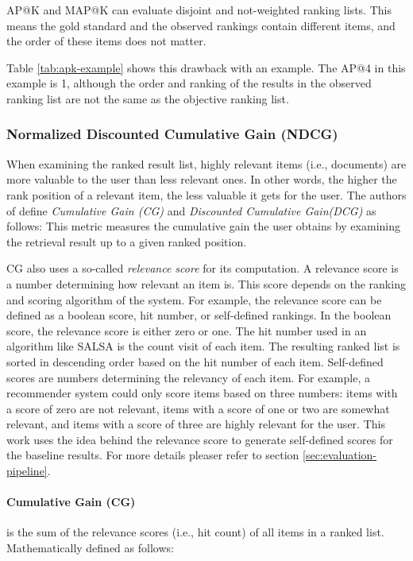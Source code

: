 AP@K and MAP@K can evaluate disjoint and not-weighted ranking lists. This means the gold standard and the observed rankings contain different items, and the order of these items does not matter.

Table \ref{tab:apk-example} shows this drawback with an example. The AP@4 in this example is 1, although the order and ranking of the results in the observed ranking list are not the same as the objective ranking list.

\subsubsection{Normalized Discounted Cumulative Gain (NDCG)}
\label{subsubsection:cg-dcg-ndcg}
When examining the ranked result list, highly relevant items (i.e., documents) are more valuable to the user than less relevant ones. In other words, the higher the rank position of a relevant item, the less valuable it gets for the user. The authors of \cite{jarvelinCumulatedGainbasedEvaluation2002} define \emph{Cumulative Gain (CG)} and \emph{Discounted Cumulative Gain(DCG)} as follows: This metric measures the cumulative gain the user obtains by examining the retrieval result up to a given ranked position. 


CG also uses a so-called \emph{relevance score} for its computation. A relevance score is a number determining how relevant an item is. This score depends on the ranking and scoring algorithm of the system. For example, the relevance score can be defined as a boolean score, hit number, or self-defined rankings. In the boolean score, the relevance score is either zero or one. The hit number used in an algorithm like SALSA \cite{lempelSALSAStochasticApproach2001} is the count visit of each item. The resulting ranked list is sorted in descending order based on the hit number of each item. Self-defined scores are numbers determining the relevancy of each item. For example, a recommender system could only score items based on three numbers: items with a score of zero are not relevant, items with a score of one or two are somewhat relevant, and items with a score of three are highly relevant for the user. This work uses the idea behind the relevance score to generate self-defined scores for the baseline results. For more details pleaser refer to section \ref{sec:evaluation-pipeline}.


\paragraph*{Cumulative Gain (CG)}
is the sum of the relevance scores (i.e., hit count) of all items in a ranked list. Mathematically defined as follows:

